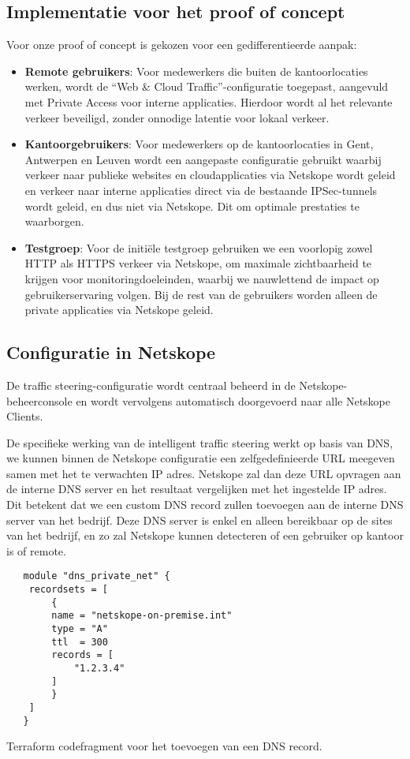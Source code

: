 \subsection{Implementatie voor het proof of concept}

Voor onze proof of concept is gekozen voor een gedifferentieerde aanpak:
\begin{itemize}
    \item \textbf{Remote gebruikers}: Voor medewerkers die buiten de kantoorlocaties werken, wordt de ``Web \& Cloud Traffic''-configuratie toegepast, aangevuld met Private Access voor interne applicaties. Hierdoor wordt al het relevante verkeer beveiligd, zonder onnodige latentie voor lokaal verkeer.

    \item \textbf{Kantoorgebruikers}: Voor medewerkers op de kantoorlocaties in Gent, Antwerpen en Leuven wordt een aangepaste configuratie gebruikt waarbij verkeer naar publieke websites en cloudapplicaties via Netskope wordt geleid en verkeer naar interne applicaties direct via de bestaande IPSec-tunnels wordt geleid, en dus niet via Netskope. Dit om optimale prestaties te waarborgen.

    \item \textbf{Testgroep}: Voor de initiële testgroep gebruiken we een voorlopig zowel HTTP als HTTPS verkeer via Netskope, om maximale zichtbaarheid te krijgen voor monitoringdoeleinden, waarbij we nauwlettend de impact op gebruikerservaring volgen. Bij de rest van de gebruikers worden alleen de private applicaties via Netskope geleid.
\end{itemize}
\subsection{Configuratie in Netskope}

De traffic steering-configuratie wordt centraal beheerd in de Netskope-beheerconsole en wordt vervolgens automatisch doorgevoerd naar alle Netskope Clients.

De specifieke werking van de intelligent traffic steering werkt op basis van DNS, we kunnen binnen de Netskope configuratie een zelfgedefinieerde URL meegeven samen met het te verwachten IP adres. Netskope zal dan deze URL opvragen aan de interne DNS server en het resultaat vergelijken met het ingestelde IP adres. Dit betekent dat we een custom DNS record zullen toevoegen aan de interne DNS server van het bedrijf. Deze DNS server is enkel en alleen bereikbaar op de sites van het bedrijf, en zo zal Netskope kunnen detecteren of een gebruiker op kantoor is of remote.
\begin{listing}[h!]
  \begin{verbatim}
   module "dns_private_net" {
    recordsets = [
        {
        name = "netskope-on-premise.int"
        type = "A"
        ttl  = 300
        records = [
            "1.2.3.4"
        ]
        }
    ]
   }
  \end{verbatim}
  \caption[Terraform codefragment DNS record]{Terraform codefragment voor het toevoegen van een DNS record.}
\end{listing}

